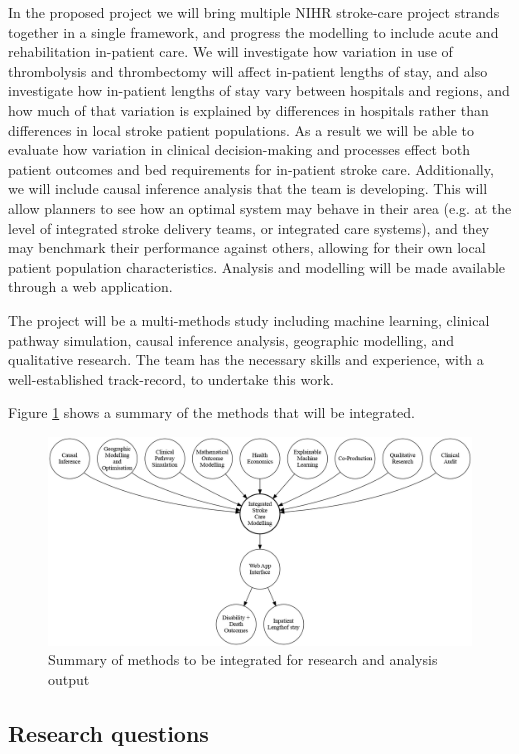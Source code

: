 In the proposed project we will bring multiple NIHR stroke-care project strands together in a single framework, and progress the modelling to include acute and rehabilitation in-patient care. We will investigate how variation in use of thrombolysis and thrombectomy will affect in-patient lengths of stay, and also investigate how in-patient lengths of stay vary between hospitals and regions, and how much of that variation is explained by differences in hospitals rather than differences in local stroke patient populations. As a result we will be able to evaluate how variation in clinical decision-making and processes effect both patient outcomes and bed requirements for in-patient stroke care. Additionally, we will include causal inference analysis that the team is developing. This will allow planners to see how an optimal system may behave in their area (e.g. at the level of integrated stroke delivery teams, or integrated care systems), and they may benchmark their performance against others, allowing for their own local patient population characteristics. Analysis and modelling will be made available through a web application.

The project will be a multi-methods study including machine learning, clinical pathway simulation, causal inference analysis, geographic modelling, and qualitative research. The team has the necessary skills and experience, with a well-established track-record, to undertake this work.

Figure \ref{fig:methods} shows a summary of the methods that will be integrated.

\begin{figure}[h!]
\centering
\includegraphics[width=1.0\textwidth]{./images/methods}
\caption{Summary of methods to be integrated for research and analysis output}
\label{fig:methods}
\end{figure}

\subsection*{Research questions}

